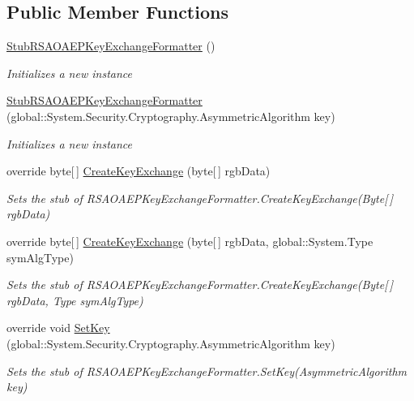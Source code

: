 \subsection*{Public Member Functions}
\begin{DoxyCompactItemize}
\item 
\hyperlink{class_system_1_1_security_1_1_cryptography_1_1_fakes_1_1_stub_r_s_a_o_a_e_p_key_exchange_formatter_aa46a27f0c538c893f0f773f1533afc20}{Stub\-R\-S\-A\-O\-A\-E\-P\-Key\-Exchange\-Formatter} ()
\begin{DoxyCompactList}\small\item\em Initializes a new instance\end{DoxyCompactList}\item 
\hyperlink{class_system_1_1_security_1_1_cryptography_1_1_fakes_1_1_stub_r_s_a_o_a_e_p_key_exchange_formatter_ab13024dcb0bc3ca532e73807aa470b3b}{Stub\-R\-S\-A\-O\-A\-E\-P\-Key\-Exchange\-Formatter} (global\-::\-System.\-Security.\-Cryptography.\-Asymmetric\-Algorithm key)
\begin{DoxyCompactList}\small\item\em Initializes a new instance\end{DoxyCompactList}\item 
override byte\mbox{[}$\,$\mbox{]} \hyperlink{class_system_1_1_security_1_1_cryptography_1_1_fakes_1_1_stub_r_s_a_o_a_e_p_key_exchange_formatter_a60a1b0356fa8e33d15455418655983b5}{Create\-Key\-Exchange} (byte\mbox{[}$\,$\mbox{]} rgb\-Data)
\begin{DoxyCompactList}\small\item\em Sets the stub of R\-S\-A\-O\-A\-E\-P\-Key\-Exchange\-Formatter.\-Create\-Key\-Exchange(\-Byte\mbox{[}$\,$\mbox{]} rgb\-Data)\end{DoxyCompactList}\item 
override byte\mbox{[}$\,$\mbox{]} \hyperlink{class_system_1_1_security_1_1_cryptography_1_1_fakes_1_1_stub_r_s_a_o_a_e_p_key_exchange_formatter_a4a7ab4d00b03c9cc6be19ebc3009ec52}{Create\-Key\-Exchange} (byte\mbox{[}$\,$\mbox{]} rgb\-Data, global\-::\-System.\-Type sym\-Alg\-Type)
\begin{DoxyCompactList}\small\item\em Sets the stub of R\-S\-A\-O\-A\-E\-P\-Key\-Exchange\-Formatter.\-Create\-Key\-Exchange(\-Byte\mbox{[}$\,$\mbox{]} rgb\-Data, Type sym\-Alg\-Type)\end{DoxyCompactList}\item 
override void \hyperlink{class_system_1_1_security_1_1_cryptography_1_1_fakes_1_1_stub_r_s_a_o_a_e_p_key_exchange_formatter_a471b2dded1c01d043a3fe1d0b8f9f5ce}{Set\-Key} (global\-::\-System.\-Security.\-Cryptography.\-Asymmetric\-Algorithm key)
\begin{DoxyCompactList}\small\item\em Sets the stub of R\-S\-A\-O\-A\-E\-P\-Key\-Exchange\-Formatter.\-Set\-Key(\-Asymmetric\-Algorithm key)\end{DoxyCompactList}\end{DoxyCompactItemize}
